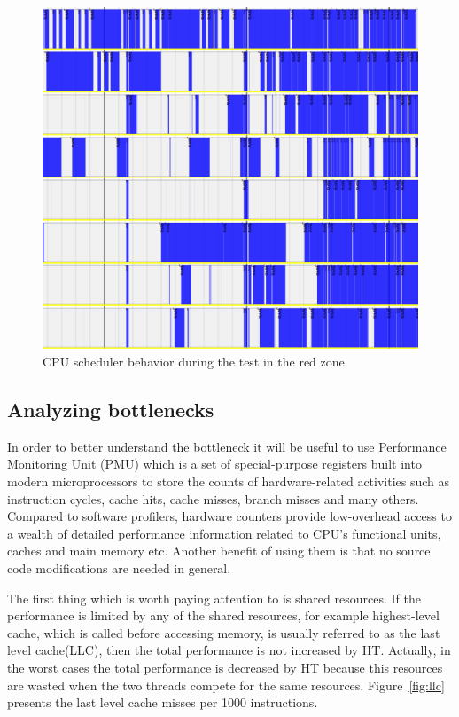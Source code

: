 \documentclass[12pt]{article}
\begin{document}
\begin{figure}[h]
    \centering
	\includegraphics[scale=0.8]{images/scheduler.png}
	\caption{CPU scheduler behavior during the test in the red zone}
    \label{fig:sched}
\end{figure}

\subsection{Analyzing bottlenecks}

In order to better understand the bottleneck it will be useful to use Performance Monitoring Unit (PMU) which is a set of special-purpose registers built into modern microprocessors to store the counts of hardware-related activities such as instruction cycles, cache hits, cache misses, branch misses and many others. Compared to software profilers, hardware counters provide low-overhead access to a wealth of detailed performance information related to CPU's functional units, caches and main memory etc. Another benefit of using them is that no source code modifications are needed in general.

The first thing which is worth paying attention to is shared resources. If the performance is limited by any of the shared resources, for example highest-level cache, which is called before accessing memory, is usually referred to as the last level cache(LLC), then the total performance is not increased by HT. Actually, in the worst cases the total performance is decreased by HT because this resources are wasted when the two threads compete for the same resources. Figure~\ref{fig:llc} presents the last level cache misses per 1000 instructions.
\end{document}
